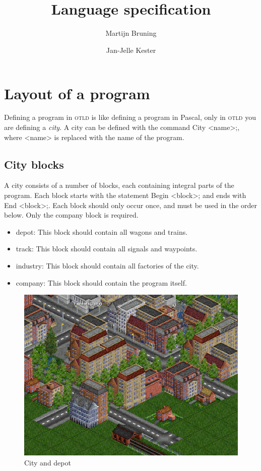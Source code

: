 \documentclass[10pt,a4paper]{article}
\title{\Huge \name \\ \LARGE Language specification}
\author{Martijn Bruning \and Jan-Jelle Kester}
\newcommand{\code}[1]{{\ttfamily\small #1}}
\newcommand{\shortname}{\textsc{otld} }
\begin{document}
\maketitle

\section{Layout of a program}

Defining a program in \shortname is like defining a program in Pascal, only in \shortname you are defining a \emph{city}. A city can be defined with the command \code{City <name>;}, where \code{<name>} is replaced with the name of the program.

\subsection{City blocks}

A city consists of a number of blocks, each containing integral parts of the program. Each block starts with the statement \code{Begin <block>;} and ends with \code{End <block>;}. Each block should only occur once, and must be used in the order below. Only the \code{company} block is required.

\begin{itemize}
\item \code{depot}: This block should contain all wagons and trains.
\item \code{track}: This block should contain all signals and waypoints.
\item \code{industry}: This block should contain all factories of the city.
\item \code{company}: This block should contain the program itself.
\end{itemize}

\begin{figure}[t]
\centering
\includegraphics[scale=0.25]{Images/city_and_depot}
\caption{City and depot}
\label{fig:city_and_depot}
\end{figure}
\end{document}

